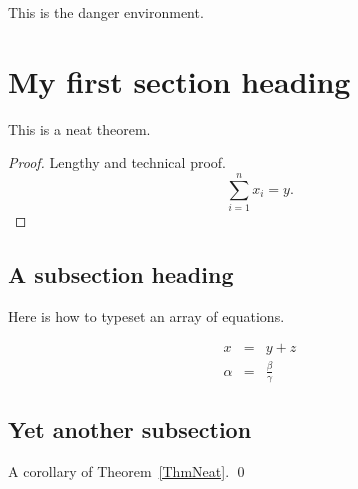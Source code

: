 \documentclass[12pt]{report}
\begin{document}

\maketitle

\vspace*{.1in}




\begin{danger}
This is the danger environment.
\end{danger}

\section{My first section heading}


\begin{theorem}
\label{ThmNeat}
This is a neat theorem.
\end{theorem}

\begin{proof}
Lengthy and technical proof.
\begin{equation}
\sum_{i=1}^n x_i = y.
\end{equation}
\end{proof}


\subsection{A subsection heading}


Here is how to typeset an array of equations.

\begin{eqnarray}
	x & = & y + z \\
%
     \alpha & = & \frac{\beta}{\gamma}
\end{eqnarray}







\subsection{Yet another subsection}


\begin{corollary}
\label{CorThmNeat}
A corollary of Theorem~\ref{ThmNeat}.
\qed
\end{corollary}
\end{document}
